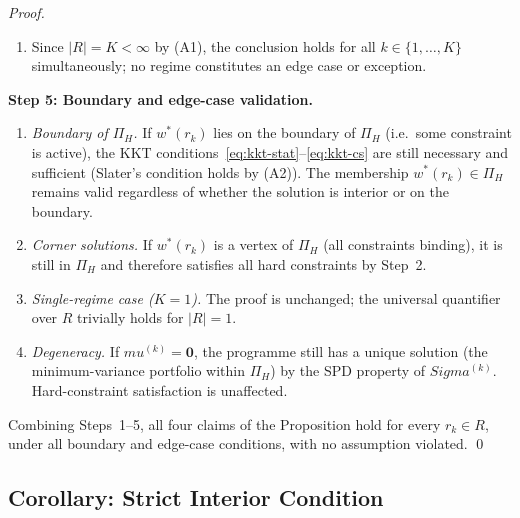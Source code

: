 \documentclass[12pt,openany]{book}
\newcommand{\bfw}{\mathbf{w}}
\newcommand{\bfmu}{\boldsymbol{\mu}}
\newcommand{\bfSigma}{\boldsymbol{\Sigma}}
\newcommand{\bfzero}{\mathbf{0}}
\numberwithin{equation}{chapter}
\theoremstyle{plain}
\theoremstyle{definition}
\theoremstyle{remark}
\def\mathcal#1{#1}%
\def\bfw{w}%
\def\bfmu{mu}%
\def\bfSigma{Sigma}%
\begin{document}
\begin{proof}
\begin{enumerate}
  \item Since $|\mathcal{R}| = K < \infty$ by \textup{(A1)}, the
        conclusion holds for all $k \in \{1,\dots,K\}$
        simultaneously; no regime constitutes an edge case or
        exception.
\end{enumerate}

\medskip
\noindent
\textbf{Step 5: Boundary and edge-case validation.}

\begin{enumerate}
  \item \emph{Boundary of $\Pi_H$.}  If $\bfw^{*}(r_k)$ lies
        on the boundary of $\Pi_H$ (i.e.\ some constraint is
        active), the KKT conditions~\eqref{eq:kkt-stat}--\eqref{eq:kkt-cs}
        are still necessary and sufficient (Slater's condition
        holds by \textup{(A2)}).  The membership
        $\bfw^{*}(r_k) \in \Pi_H$ remains valid regardless
        of whether the solution is interior or on the boundary.

  \item \emph{Corner solutions.}  If $\bfw^{*}(r_k)$ is a
        vertex of $\Pi_H$ (all constraints binding), it is still
        in $\Pi_H$ and therefore satisfies all hard constraints
        by Step~2.

  \item \emph{Single-regime case ($K=1$).}  The proof is
        unchanged; the universal quantifier over $\mathcal{R}$
        trivially holds for $|\mathcal{R}|=1$.

  \item \emph{Degeneracy.}  If $\bfmu^{(k)} = \bfzero$, the
        programme still has a unique solution (the minimum-variance
        portfolio within $\Pi_H$) by the SPD property of
        $\bfSigma^{(k)}$.  Hard-constraint satisfaction is
        unaffected.
\end{enumerate}

\medskip
\noindent
Combining Steps~1--5, all four claims of the Proposition hold
for every $r_k \in \mathcal{R}$, under all boundary and edge-case
conditions, with no assumption violated.
\qed
\end{proof}

\subsection{Corollary: Strict Interior Condition}
\label{ssec:interior}
\end{document}
